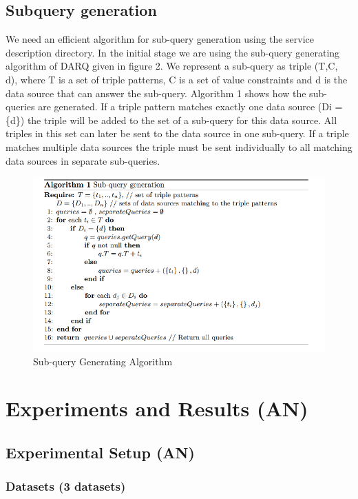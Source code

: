 \documentclass{sig-alternate}  %
\begin{document}
\subsection{Subquery generation}
We need an efficient algorithm for sub-query generation using the
service description directory. In the initial stage we are using the
sub-query generating algorithm of DARQ given in figure 2. We represent
a sub-query as triple (T,C, d), where T is a set of triple patterns,
C is a set of value constraints and d is the data source that can
answer the sub-query. Algorithm 1 shows how the sub-queries are generated.
If a triple pattern matches exactly one data source (Di
= \{d\}) the triple will be added to the set of a sub-query for this
data source. All triples in this set can later be sent to the data
source in one sub-query. If a triple matches multiple data sources
the triple must be sent individually to all matching data sources
in separate sub-queries.
\begin{figure}
\begin{centering}
\includegraphics[scale=0.7]{Algo1} 
\par\end{centering}
\caption{Sub-query Generating Algorithm}
\end{figure}

\section{Experiments and Results (AN)}
\subsection{Experimental Setup (AN)}
\subsubsection{Datasets (3 datasets)}
\end{document}
